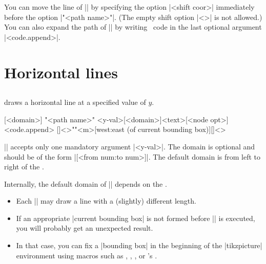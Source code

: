You can move the line of |\tzLFn| by specifying the option |<shift coor>| immediately before the option |"<path name>"|. (The empty shift option |<>| is not allowed.)
You can also expand the path of |\tzLFn| by writing \Tikz\ code in the last optional argument |<code.append>|.

\begin{tzcode}{.3}
\end{tzcode}


\section{Horizontal lines}
\label{s:tzhfn}

\subsection{\protect\cmd{\tzhfnat}}
\label{ss:tzhfnat}

\icmd{\tzhfnat} draws a horizontal line at a specified value of $y$.


\begin{tzdef}{}
[<domain>]
"<path name>"
        {<y-val>}[<domain>]{<text>}[<node opt>]<code.append>
  []<>""{<m>}[west:east (of current bounding box)]{}[]<>
\end{tzdef}

|\tzhfnat| accepts only one mandatory argument |{<y-val>}|.
The domain is optional and should be of the form |[<from num:to num>]|.
The default domain is from left to right of the .

\remark Internally, the default domain of |\tzhfnat| depends on the .
\begin{itemize}
\item Each |\tzhfnat| may draw a line with a (slightly) different length.
\item If an appropriate |current bounding box| is not formed before |\tzhfnat| is executed, you will probably get an unexpected result.
\item In that case, you can fix a |bounding box| in the beginning of the |tikzpicture| environment using macros such as \icmd{\tzbbox}, \icmd{\tzhelplines*}, \icmd{\tzaxes*}, or \Tikz's \icmd{\useasboundingbox}.
\end{itemize}


